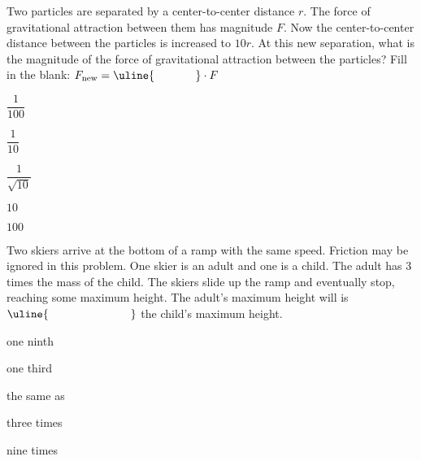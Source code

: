 \documentclass[11pt]{article}
\begin{document}
\begin{enumerate}
\begin{minipage}[t]{\lw}
\item Two particles are separated by a center-to-center distance $r$. The force of gravitational attraction between them has magnitude $F$. Now the center-to-center distance between the particles is increased to $10r$. At this new separation, what is the magnitude of the force of gravitational attraction between the particles? Fill in the blank: $F_\text{new}=\uline{\hspace{.5in}}\cdot F$
\begin{choices}
\item $\dfrac{1}{100}$\\[.1in]
\item $\dfrac{1}{10}$\\[.1in]
\item $\dfrac{1}{\sqrt{10}}$\\[.1in]
\item $10$\\[.1in]
\item $100$
\end{choices}
\end{minipage}

\begin{minipage}[t]{\lw}
\item Two skiers arrive at the bottom of a ramp with the same speed. Friction may be ignored in this problem. One skier is an adult and one is a child. The adult has 3 times the mass of the child. The skiers slide up the ramp and eventually stop, reaching some maximum height. The adult's maximum height will is $\uline{\hspace{1in}}$ the child's maximum height.
\begin{choices}
\item one ninth
\item one third
\item the same as
\item three times
\item nine times
\end{choices}
\end{minipage}


\end{enumerate}
\end{document}
